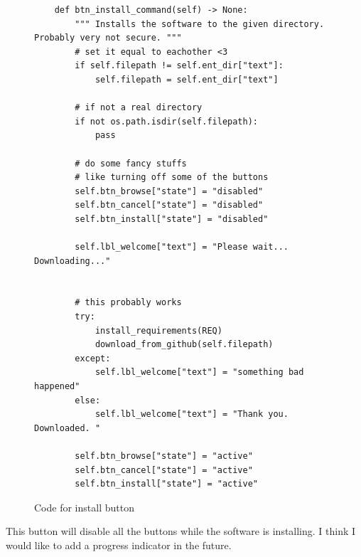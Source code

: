 \documentclass[11pt]{article}
\begin{document}
                \begin{figure}[!ht]
                   \begin{verbatim}
    def btn_install_command(self) -> None:
        """ Installs the software to the given directory. Probably very not secure. """
        # set it equal to eachother <3
        if self.filepath != self.ent_dir["text"]:
            self.filepath = self.ent_dir["text"]
            
        # if not a real directory
        if not os.path.isdir(self.filepath):
            pass
        
        # do some fancy stuffs
        # like turning off some of the buttons
        self.btn_browse["state"] = "disabled"
        self.btn_cancel["state"] = "disabled"
        self.btn_install["state"] = "disabled"
        
        self.lbl_welcome["text"] = "Please wait... Downloading..."
        
        
        # this probably works
        try:
            install_requirements(REQ)
            download_from_github(self.filepath)
        except:
            self.lbl_welcome["text"] = "something bad happened"
        else:
            self.lbl_welcome["text"] = "Thank you. Downloaded. "
        
        self.btn_browse["state"] = "active"
        self.btn_cancel["state"] = "active"
        self.btn_install["state"] = "active"
                   \end{verbatim}
                   \caption{Code for install button}
                   \label{snip:btn_install_code}
                \end{figure}

                This button will disable all the buttons while the software is installing. I think I would like to add a progress indicator in the future.
\end{document}
